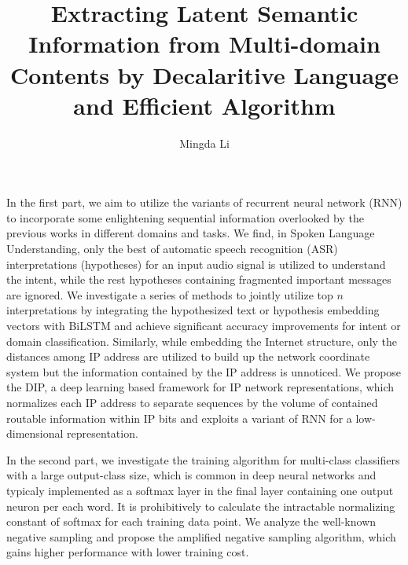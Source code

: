 \documentclass [PhD] {uclathes}
\title{Extracting Latent Semantic Information from Multi-domain Contents by Decalaritive Language and Efficient Algorithm}
\author         {Mingda Li}
\begin{document}
\makeintropages



In the first part, we aim to utilize the variants of recurrent neural network (RNN)  to incorporate some enlightening sequential information overlooked by the previous works in different domains and tasks. 
We find, 
in Spoken Language Understanding, only the best of automatic speech recognition (ASR)  interpretations (hypotheses) for  an input audio signal is utilized to understand the intent, while the rest hypotheses containing fragmented important messages are ignored. We investigate a series of  methods to jointly utilize top $n$ interpretations by integrating the hypothesized text or hypothesis embedding vectors with BiLSTM and achieve significant accuracy improvements for intent or domain classification.   
Similarly, while embedding  the Internet structure,  only the distances among IP address are utilized to build up the network coordinate system  but the information contained by the  IP address  is unnoticed. 
We propose the DIP, a deep learning based framework for IP network representations, which normalizes each IP address to separate sequences by the volume of contained routable information within IP bits and exploits a variant of RNN for a low-dimensional representation.  

In the second part, we investigate the training algorithm for multi-class classifiers with a large output-class size, which is common in deep neural networks and typicaly implemented as a softmax layer in the final layer 
containing one output neuron per each word. 
It is prohibitively to calculate the intractable normalizing constant of softmax for each training data point. We analyze the well-known negative sampling and propose the amplified negative sampling algorithm, which gains higher performance with lower training cost. 
\end{document}
